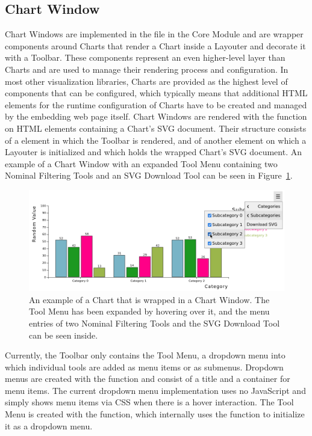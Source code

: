 \subsection{Chart Window}

Chart Windows are implemented in the  file in the Core Module and are wrapper components around Charts that render a Chart inside a Layouter and decorate it with a Toolbar.
These components represent an even higher-level layer than Charts and are used to manage their rendering process and configuration.
In most other visualization libraries, Charts are provided as the highest level of components that can be configured, which typically means that additional HTML elements for the runtime configuration of Charts have to be created and managed by the embedding web page itself.
Chart Windows are rendered with the  function on HTML  elements containing a Chart's SVG document.
Their structure consists of a  element in which the Toolbar is rendered, and of another  element on which a Layouter is initialized and which holds the wrapped Chart's SVG document. 
An example of a Chart Window with an expanded Tool Menu containing two Nominal Filtering Tools and an SVG Download Tool can be seen in Figure~\ref{fig:ChartWindow}.


\begin{figure}[tp]
  \centering
  \includegraphics[keepaspectratio,width=\linewidth,height=\fullh]{images/chart-window.png}
  \caption[Chart Window Example]{
    An example of a Chart that is wrapped in a Chart Window.
    The Tool Menu has been expanded by hovering over it, and the menu entries of two Nominal Filtering Tools and the SVG Download Tool can be seen inside.
  }
  \label{fig:ChartWindow}
\end{figure}


Currently, the Toolbar only contains the Tool Menu, a dropdown menu into which individual tools are added as menu items or as submenus.
Dropdown menus are created with the  function and consist of a title and a container for menu items.
The current dropdown menu implementation uses no JavaScript and simply shows menu items via CSS when there is a hover interaction. 
The Tool Menu is created with the  function, which internally uses the  function to initialize it as a dropdown menu.


